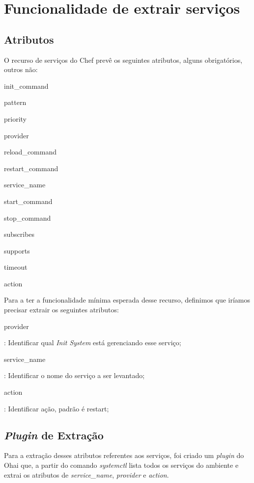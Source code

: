 \section{Funcionalidade de extrair serviços}
\label{sec:services}

\subsection{Atributos}

O recurso de serviços do Chef prevê os seguintes atributos, alguns obrigatórios, outros não:

\begin{itemize}
{\itshape\item init\_command}
{\itshape\item pattern}
{\itshape\item priority}
{\itshape\item provider}
{\itshape\item reload\_command}
{\itshape\item restart\_command}
{\itshape\item service\_name}
{\itshape\item start\_command}
{\itshape\item stop\_command}
{\itshape\item subscribes}
{\itshape\item supports}
{\itshape\item timeout}
{\itshape\item action}
\end{itemize}

Para a ter a funcionalidade mínima esperada desse recurso, definimos que iríamos precisar
extrair os seguintes atributos:


\begin{itemize}
    {\itshape\item provider}: Identificar qual \textit{Init System} está gerenciando
esse serviço;
    {\itshape\item service\_name}: Identificar o nome do serviço a
ser levantado;
    {\itshape\item action}: Identificar ação, padrão é restart;
\end{itemize}

\subsection{\textit{Plugin} de Extração}
Para a extração desses atributos referentes aos serviços, foi criado um \textit{plugin} do
Ohai que, a partir do comando \textit{systemctl} lista todos os serviços do ambiente
e extrai os atributos de \textit{service\_name}, \textit{provider}
e \textit{action}.


